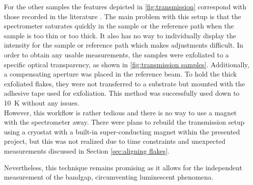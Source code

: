 \documentclass[
	twoside,
	parskip=half,
	a4paper,
]{scrbook}
\begin{document}
For the other samples the features depicted in \autoref{fig:transmission} correspond with those recorded in the literature \cite{CrPS4_transmission, NiPS3_transmission, FePS3_transmission}.
The main problem with this setup is that the spectrometer saturates quickly in the sample or the reference path when the sample is too thin or too thick.
It also has no way to individually display the intensity for the sample or reference path which makes adjustments difficult.
In order to obtain any usable measurements, the samples were exfoliated to a specific optical transparency, as shown in \autoref{fig:transmission samples}.
Additionally, a compensating aperture was placed in the reference beam.
To hold the thick exfoliated flakes, they were not transferred to a substrate but mounted with the adhesive tape used for exfoliation. 
This method was successfully used down to \SI{10}{K} without any issues.\\
However, this workflow is rather tedious and there is no way to use a magnet with the spectrometer away.
There were plans to rebuild the transmission setup using a cryostat with a built-in super-conducting magnet within the presented project, but this was not realized due to time constraints and unexpected measurements discussed in Section \ref{sec:aligning flakes}.

Nevertheless, this technique remains promising as it allows for the independent measurement of the bandgap, circumventing luminescent phenomena.

\clearpage
\end{document}
